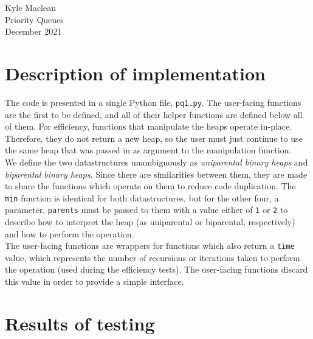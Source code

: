 \documentclass{article}
\begin{document}
Kyle Maclean \\
Priority Queues\\
December 2021

\section{Description of implementation}

The code is presented in a single Python file, \texttt{pq1.py}. The user-facing functions are the first to be defined, and all of their helper functions are defined below all of them. For efficiency, functions that manipulate the heaps operate in-place. Therefore, they do not return a new heap, so the user must just continue to use the same heap that was passed in as argument to the manipulation function. \\
We define the two datastructures unambiguously as \textit{uniparental binary heaps} and \textit{biparental binary heaps}. Since there are similarities between them, they are made to share the functions which operate on them to reduce code duplication. The \texttt{min} function is identical for both datastructures, but for the other four, a parameter, \texttt{parents} must be passed to them with a value either of \texttt{1} or \texttt{2} to describe how to interpret the heap (as uniparental or biparental, respectively) and how to perform the operation. \\
The user-facing functions are wrappers for functions which also return a \texttt{time} value, which represents the number of recursions or iterations taken to perform the operation (used during the efficiency tests). The user-facing functions discard this value in order to provide a simple interface.

\section{Results of testing}
\end{document}
